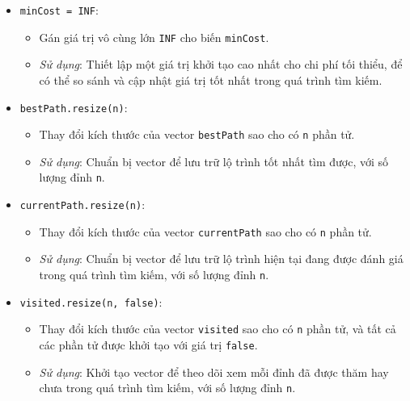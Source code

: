 \documentclass[a4paper]{article}
\begin{document}
\begin{itemize}
\begin{itemize}
    \item \texttt{minCost = INF}:
    \begin{itemize}
        \item Gán giá trị vô cùng lớn \texttt{INF} cho biến \texttt{minCost}.
        \item \textit{Sử dụng}: Thiết lập một giá trị khởi tạo cao nhất cho chi phí tối thiểu, để có thể so sánh và cập nhật giá trị tốt nhất trong quá trình tìm kiếm.
    \end{itemize}
    
    \item \texttt{bestPath.resize(n)}:
    \begin{itemize}
        \item Thay đổi kích thước của vector \texttt{bestPath} sao cho có \texttt{n} phần tử.
        \item \textit{Sử dụng}: Chuẩn bị vector để lưu trữ lộ trình tốt nhất tìm được, với số lượng đỉnh \texttt{n}.
    \end{itemize}
    
    \item \texttt{currentPath.resize(n)}:
    \begin{itemize}
        \item Thay đổi kích thước của vector \texttt{currentPath} sao cho có \texttt{n} phần tử.
        \item \textit{Sử dụng}: Chuẩn bị vector để lưu trữ lộ trình hiện tại đang được đánh giá trong quá trình tìm kiếm, với số lượng đỉnh \texttt{n}.
    \end{itemize}
    
    \item \texttt{visited.resize(n, false)}:
    \begin{itemize}
        \item Thay đổi kích thước của vector \texttt{visited} sao cho có \texttt{n} phần tử, và tất cả các phần tử được khởi tạo với giá trị \texttt{false}.
        \item \textit{Sử dụng}: Khởi tạo vector để theo dõi xem mỗi đỉnh đã được thăm hay chưa trong quá trình tìm kiếm, với số lượng đỉnh \texttt{n}.
    \end{itemize}
\end{itemize}


\end{itemize}
\end{document}

